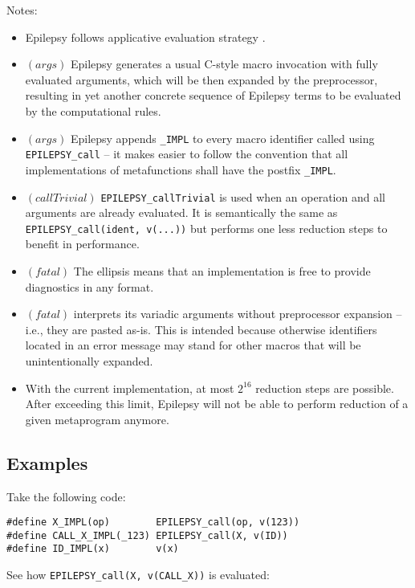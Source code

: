 \documentclass[12pt]{article}
\theoremstyle{break}
\begin{document}
Notes:

\begin{itemize}
    \item Epilepsy follows applicative evaluation strategy \cite{ApplicativeEvaluationStrategy}.

    \item $(args)$ Epilepsy generates a usual C-style macro invocation with
    fully evaluated arguments, which will be then expanded by the preprocessor, resulting
    in yet another concrete sequence of Epilepsy terms to be evaluated by the computational
    rules.
    \item $(args)$ Epilepsy appends \texttt{\_IMPL} to every macro identifier called using
    \texttt{EPILEPSY\_call} -- it makes easier to follow the convention that all implementations
    of metafunctions shall have the postfix \texttt{\_IMPL}.
    \item $(callTrivial)$ \texttt{EPILEPSY\_callTrivial} is used when an operation and all
    arguments are already evaluated. It is semantically the same as \texttt{EPILEPSY\_call(ident, v(...))}
    but performs one less reduction steps to benefit in performance.
    \item $(fatal)$ The ellipsis means that an implementation is free to provide
    diagnostics in any format.
    \item $(fatal)$ interprets its variadic arguments without preprocessor expansion -- i.e.,
    they are pasted as-is. This is intended because otherwise identifiers located in an
    error message may stand for other macros that will be unintentionally expanded.
    \item With the current implementation, at most $2^{16}$ reduction steps are
    possible. After exceeding this limit, Epilepsy will not be able to perform reduction
    of a given metaprogram anymore.
\end{itemize}

\subsection{Examples}

Take the following code:

\begin{verbatim}
#define X_IMPL(op)        EPILEPSY_call(op, v(123))
#define CALL_X_IMPL(_123) EPILEPSY_call(X, v(ID))
#define ID_IMPL(x)        v(x)
\end{verbatim}

See how \texttt{EPILEPSY\_call(X, v(CALL\_X))} is evaluated:
\end{document}
